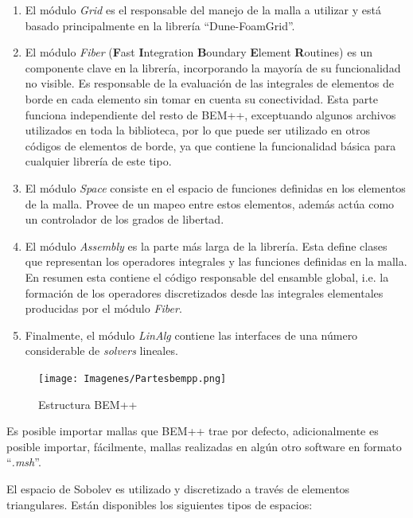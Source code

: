 \documentclass[12pt,letterpaper]{article}
\numberwithin{equation}{section}
\begin{document}
\begin{enumerate}
	\item El módulo \textit{Grid} es el responsable del manejo de la malla a utilizar y está basado principalmente en la librería ``Dune-FoamGrid''.
	\item El módulo \textit{Fiber} (\textbf{F}ast \textbf{I}ntegration \textbf{B}oundary \textbf{E}lement \textbf{R}outines) es un componente clave en la librería, incorporando la mayoría de su funcionalidad no visible. Es responsable de la evaluación de las integrales de elementos de borde en cada elemento sin tomar en cuenta su conectividad. Esta parte funciona independiente del resto de BEM++, exceptuando algunos archivos utilizados en toda la biblioteca, por lo que puede ser utilizado en otros códigos de elementos de borde, ya que contiene la funcionalidad básica para cualquier librería de este tipo.
	\item El módulo \textit{Space} consiste en el espacio de funciones definidas en los elementos de la malla. Provee de un mapeo entre estos elementos, además actúa como un controlador de los grados de libertad.
	\item El módulo \textit{Assembly} es la parte más larga de la librería. Esta define clases que representan los operadores integrales y las funciones definidas en la malla. En resumen esta contiene el código responsable del ensamble global, i.e. la formación de los operadores discretizados desde las integrales elementales producidas por el módulo \textit{Fiber}.
	\item Finalmente, el módulo \textit{LinAlg} contiene las interfaces de una número considerable de \textit{solvers} lineales.
\end{enumerate}

	
\begin{figure}[H]
	\centering\texttt{[image: Imagenes/Partesbempp.png]}\\
	\caption{Estructura BEM++}
	\label{fig:Partesbempp}
\end{figure} 

Es posible importar mallas que BEM++ trae por defecto, adicionalmente es posible importar, fácilmente, mallas realizadas en algún otro software en formato ``\textit{.msh}''.

El espacio de Sobolev es utilizado y discretizado a través de elementos triangulares. Están disponibles los siguientes tipos de espacios:
\end{document}
